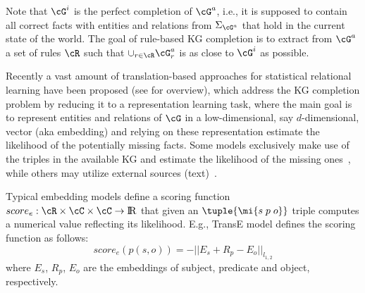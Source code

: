 Note that $\cG^i$ is the perfect completion of $\cG^a$, i.e., it is supposed to contain all
correct facts with entities and relations from $\Sigma_{\cG^a}$ that hold
in the current state of the world. The goal of rule-based KG completion is to extract from $\cG^a$ a set of rules $\cR$ such that $\cup_{r\in \cR}\cG^a_{r}$ is as close to $ \cG^i$ as possible.

 Recently a vast amount of translation-based approaches for statistical relational learning have been proposed  (see \cite{DBLP:journals/tkde/WangMWG17} for overview), which address the KG completion problem by reducing it to a representation learning task, where the main goal is to represent entities and relations of $\cG$ in a
low-dimensional, say $d$-dimensional, vector (aka embedding) and relying on these representation estimate the likelihood of the potentially missing facts. 
Some models  exclusively make use of the triples in the available KG and estimate the likelihood of the missing ones~\cite{Bordes:2013:TEM:2999792.2999923,DBLP:conf/aaai/NickelRP16}, while others may utilize external sources (\eg text)~\cite{DBLP:conf/aaai/0005HMZ17}. 

Typical embedding models define a scoring function $score_e: \cR \times \cC \times \cC  \rightarrow {\rm I\!R}$ 
that given an $\tuple{\mi{s\;p\;o}}$ triple computes a numerical value reflecting its likelihood. %
E.g., TransE \cite{Bordes:NIPS2013} model defines the scoring function as follows:
\[score_e(p(s,o)) = -||E_s + R_p - E_o||_{l_{1,2}}\]
where $E_s$, $R_p$, $E_o$ are the embeddings of subject, predicate and object, respectively.


